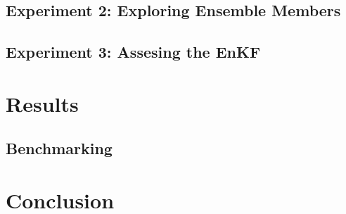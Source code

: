 \documentclass{article}
\begin{document}


\subsection{Experiment 2: Exploring Ensemble Members}



\subsection{Experiment 3: Assesing the EnKF}


\section{Results}\label{sec:results}

\subsection{Benchmarking}\label{sub:results:bench}


\section{Conclusion}\label{sec:conc}



\end{document}
